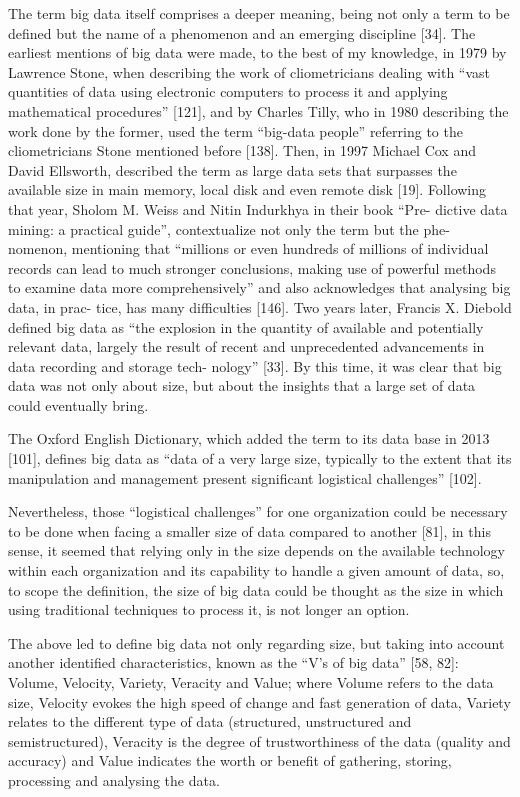 The term big data itself comprises a deeper meaning, being not only a term to be
defined but the name of a phenomenon and an emerging discipline [34]. The earliest
mentions of big data were made, to the best of my knowledge, in 1979 by Lawrence
Stone, when describing the work of cliometricians dealing with “vast quantities of data
using electronic computers to process it and applying mathematical procedures” [121],
and by Charles Tilly, who in 1980 describing the work done by the former, used the
term “big-data people” referring to the cliometricians Stone mentioned before [138].
Then, in 1997 Michael Cox and David Ellsworth, described the term as large data
sets that surpasses the available size in main memory, local disk and even remote disk
[19]. Following that year, Sholom M. Weiss and Nitin Indurkhya in their book “Pre-
dictive data mining: a practical guide”, contextualize not only the term but the phe-
nomenon, mentioning that “millions or even hundreds of millions of individual records can lead to much stronger conclusions, making use of powerful methods to examine
data more comprehensively” and also acknowledges that analysing big data, in prac-
tice, has many difficulties [146]. Two years later, Francis X. Diebold defined big data
as “the explosion in the quantity of available and potentially relevant data, largely the
result of recent and unprecedented advancements in data recording and storage tech-
nology” [33]. By this time, it was clear that big data was not only about size, but about
the insights that a large set of data could eventually bring.

The Oxford English Dictionary, which added the term to its data base in 2013
[101], defines big data as “data of a very large size, typically to the extent that its
manipulation and management present significant logistical challenges” [102].

Nevertheless, those “logistical challenges” for one organization could be necessary
to be done when facing a smaller size of data compared to another [81], in this sense,
it seemed that relying only in the size depends on the available technology within
each organization and its capability to handle a given amount of data, so, to scope the
definition, the size of big data could be thought as the size in which using traditional
techniques to process it, is not longer an option. 

The above led to define big data not only regarding size, but taking into account
another identified characteristics, known as the “V’s of big data” [58, 82]: Volume,
Velocity, Variety, Veracity and Value; where Volume refers to the data size, Velocity
evokes the high speed of change and fast generation of data, Variety relates to the
different type of data (structured, unstructured and semistructured), Veracity is the
degree of trustworthiness of the data (quality and accuracy) and Value indicates the
worth or benefit of gathering, storing, processing and analysing the data.

